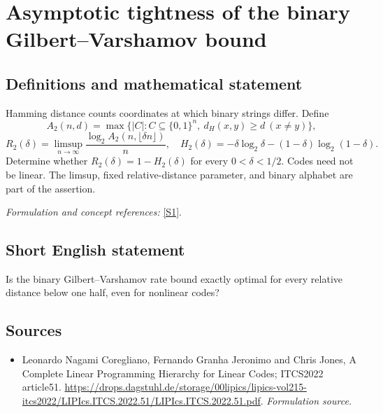 \documentclass[11pt]{article}
\begin{document}
\section*{\texorpdfstring{Asymptotic tightness of the binary Gilbert–Varshamov bound}{Asymptotic tightness of the binary Gilbert–Varshamov bound}}\label{145}
\subsection{Definitions and mathematical statement}
Hamming distance counts coordinates at which binary strings differ. Define
\[
 A_2(n,d)=\max\{|C|:C\subseteq\{0,1\}^n,\ d_H(x,y)\ge d\ (x\ne y)\},
\]
\[
 R_2(\delta)=\limsup_{n\to\infty}\frac{\log_2A_2(n,\lfloor\delta n\rfloor)}n,
 \quad H_2(\delta)=-\delta\log_2\delta-(1-\delta)\log_2(1-\delta).
\]
Determine whether $R_2(\delta)=1-H_2(\delta)$ for every $0<\delta<1/2$. Codes need not be linear. The limsup, fixed relative-distance parameter, and binary alphabet are part of the assertion.
\par\smallskip\textit{Formulation and concept references:} \href{https://drops.dagstuhl.de/storage/00lipics/lipics-vol215-itcs2022/LIPIcs.ITCS.2022.51/LIPIcs.ITCS.2022.51.pdf}{[S1]}.

\subsection{Short English statement}
Is the binary Gilbert--Varshamov rate bound exactly optimal for every relative distance below one half, even for nonlinear codes?
\subsection{Sources}
\begin{itemize}
\item[S1]Leonardo Nagami Coregliano, Fernando Granha Jeronimo and Chris Jones, A Complete Linear Programming Hierarchy for Linear Codes; ITCS2022 article51.
\url{https://drops.dagstuhl.de/storage/00lipics/lipics-vol215-itcs2022/LIPIcs.ITCS.2022.51/LIPIcs.ITCS.2022.51.pdf}.
\textit{Formulation source.}
\end{itemize}
\end{document}
